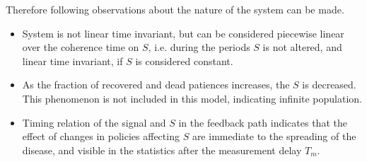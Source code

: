 Therefore following observations about the nature of the
system can be made.
\begin{itemize}
    \item System is not linear time invariant, but can be considered piecewise
        linear over
        the coherence time on $S$, i.e. during the periods $S$ is not altered,
        and linear time invariant, if $S$ is considered constant.
    \item As the fraction of recovered and dead patiences increases, the $S$
        is decreased. This phenomenon is not included in this model,
        indicating infinite population.
    \item Timing relation of the signal and $S$ in the feedback path indicates
        that the effect of changes in policies affecting $S$ are immediate to
        the spreading of the disease, and visible in the statistics after the
        measurement delay $T_m$.
\end{itemize}

